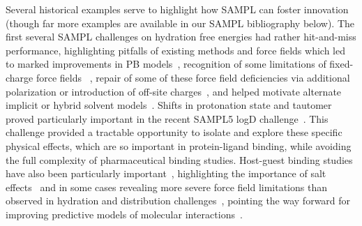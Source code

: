 \documentclass[11pt]{article}
\begin{document}
Several historical examples serve to highlight how SAMPL can foster innovation (though far more examples are available in our SAMPL bibliography below). 
The first several SAMPL challenges on hydration free energies had rather hit-and-miss performance, highlighting pitfalls of existing methods and force fields which led to marked improvements in PB models~\cite{nicholls_samp1_2009, ellingson_analysis_2010,ellingson_efficient_2014}, recognition of some limitations of fixed-charge force fields ~\cite{mobley_alchemical_2012, Fennell:2014:J.Phys.Chem.B},
repair of some of these force field deficiencies via additional polarization or introduction of off-site charges~\cite{mobley_alchemical_2012, Fennell:2014:J.Phys.Chem.B, paranahewage_predicting_2016},
and helped motivate alternate implicit or hybrid solvent models~\cite{sulea_predicting_2011, li_testing_2014, brini_adapting_2016}.
{\color{red}{Together these advances led to a marked improvement in accuracy for calculations of hydration free energies between SAMPLX and SAMPLY (Figure []).}}
%
%
Shifts in protonation state and tautomer proved particularly important in the recent SAMPL5 logD challenge~\cite{bannan_blind_2016, klamt_prediction_2016}.
This challenge provided a tractable opportunity to isolate and explore these specific physical effects, which are so important in protein-ligand binding, while avoiding the full complexity of pharmaceutical binding studies.
Host-guest binding studies have also been particularly important~\cite{mobley_predicting_2016},
highlighting the importance of salt effects~\cite{yin_overview_2016, muddana_blind_2014, mobley_predicting_2016}
and in some cases revealing more severe force field limitations than observed in hydration and distribution challenges~\cite{yin_sampl5_2016, muddana_sampl4_2014-1}, pointing the way forward for improving predictive models of molecular interactions~\cite{yin_toward_2015, mobley_predicting_2016}.
\end{document}
